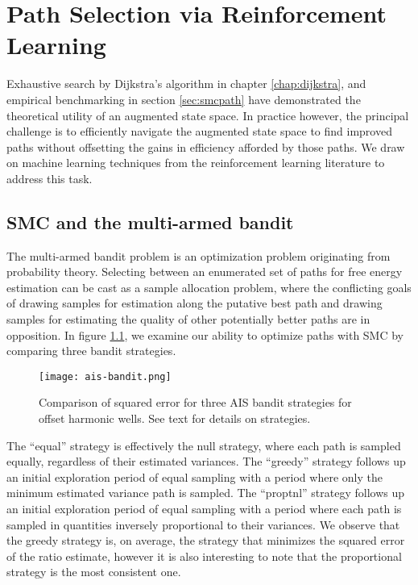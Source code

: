 
\chapter{Path Selection via Reinforcement Learning}
\label{chap:ql}

Exhaustive search by Dijkstra's algorithm in chapter \ref{chap:dijkstra}, and empirical benchmarking in section \ref{sec:smcpath} have demonstrated the theoretical utility of an augmented state space. 
In practice however, the principal challenge is to efficiently navigate the augmented state space to find improved paths without offsetting the gains in efficiency afforded by those paths.
We draw on machine learning techniques from the reinforcement learning literature to address this task.

\section{SMC and the multi-armed bandit}

The multi-armed bandit problem\cite{tokic2011value, scott2010modern, vermorel2005multi} is an optimization problem originating from probability theory. 
Selecting between an enumerated set of paths for free energy estimation can be cast as a sample allocation problem, where the conflicting goals of drawing samples for estimation along the putative best path and drawing samples for estimating the quality of other potentially better paths are in opposition. 
In figure \ref{fig:aisbandit}, we examine our ability to optimize paths with SMC by comparing three bandit strategies. 

\begin{figure}
    \centering
    \texttt{[image: ais-bandit.png]}
    \caption[Comparison of three AIS bandit strategies]{Comparison of squared error for three AIS bandit strategies for offset harmonic wells. See text for details on strategies.}
    \label{fig:aisbandit}
\end{figure}

The ``equal'' strategy is effectively the null strategy, where each path is sampled equally, regardless of their estimated variances.
The ``greedy'' strategy follows up an initial exploration period of equal sampling with a period where only the minimum estimated variance path is sampled.
The ``proptnl'' strategy follows up an initial exploration period of equal sampling with a period where each path is sampled in quantities inversely proportional to their variances.
We observe that the greedy strategy is, on average, the strategy that minimizes the squared error of the ratio estimate, however it is also interesting to note that the proportional strategy is the most consistent one.

